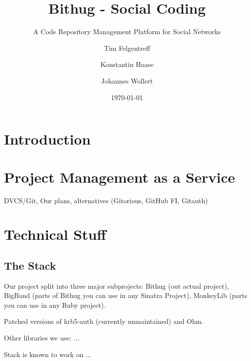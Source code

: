 \documentclass{llncs}
\begin{document}
\pagestyle{headings}  %
\mainmatter %
\title{Bithug - Social Coding}
\subtitle{A Code Repository Management Platform for Social Networks}
\author{Tim Felgentreff\and Konstantin Haase\and Johannes Wollert}
\date{\today}

\maketitle
\begin{abstract}

\end{abstract}
\section{Introduction}

\section{Project Management as a Service}
DVCS/Git, Our plans, alternatives (Gitorious, GitHub FI, Gitauth)

\section{Technical Stuff}

\subsection{The Stack}
Our project split into three major subprojects: Bithug (out actual project), BigBand (parts of Bithug you can use in any Sinatra Project), MonkeyLib (parts you can use in any Ruby project).

Patched versions of krb5-auth (currently unmaintained) and Ohm.

Other libraries we use: ...

Stack is known to work on ...
\end{document}
